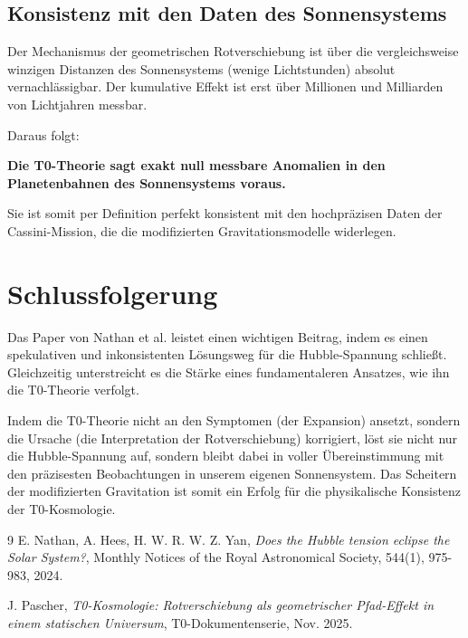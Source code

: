\subsection{Konsistenz mit den Daten des Sonnensystems}
Der Mechanismus der geometrischen Rotverschiebung ist über die vergleichsweise winzigen Distanzen des Sonnensystems (wenige Lichtstunden) absolut vernachlässigbar. Der kumulative Effekt ist erst über Millionen und Milliarden von Lichtjahren messbar.

Daraus folgt:
\begin{center}
    \textbf{Die T0-Theorie sagt exakt null messbare Anomalien in den Planetenbahnen des Sonnensystems voraus.}
\end{center}
Sie ist somit per Definition perfekt konsistent mit den hochpräzisen Daten der Cassini-Mission, die die modifizierten Gravitationsmodelle widerlegen.

\section{Schlussfolgerung}

Das Paper von Nathan et al. \cite{nathan2024} leistet einen wichtigen Beitrag, indem es einen spekulativen und inkonsistenten Lösungsweg für die Hubble-Spannung schließt. Gleichzeitig unterstreicht es die Stärke eines fundamentaleren Ansatzes, wie ihn die T0-Theorie verfolgt.

Indem die T0-Theorie nicht an den Symptomen (der Expansion) ansetzt, sondern die Ursache (die Interpretation der Rotverschiebung) korrigiert, löst sie nicht nur die Hubble-Spannung auf, sondern bleibt dabei in voller Übereinstimmung mit den präzisesten Beobachtungen in unserem eigenen Sonnensystem. Das Scheitern der modifizierten Gravitation ist somit ein Erfolg für die physikalische Konsistenz der T0-Kosmologie.

\begin{thebibliography}{9}
    E. Nathan, A. Hees, H. W. R. W. Z. Yan, \textit{Does the Hubble tension eclipse the Solar System?}, Monthly Notices of the Royal Astronomical Society, 544(1), 975-983, 2024.
    
    J. Pascher, \textit{T0-Kosmologie: Rotverschiebung als geometrischer Pfad-Effekt in einem statischen Universum}, T0-Dokumentenserie, Nov. 2025.
\end{thebibliography}
